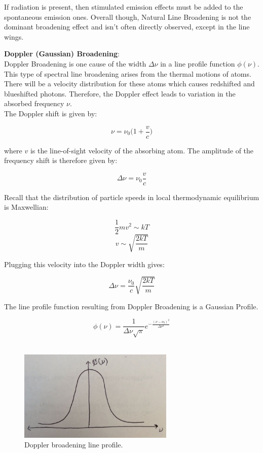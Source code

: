 \documentclass{article}
\begin{document}
If radiation is present, then stimulated emission effects must be added to the spontaneous emission ones. Overall though, Natural Line Broadening is not the dominant broadening effect and isn't often directly observed, except in the line wings.

\textbf{Doppler (Gaussian) Broadening}:\\

Doppler Broadening is one cause of the width $\Delta\nu$ in a line profile function $\phi(\nu)$. This type of spectral line broadening arises from the thermal motions of atoms. There will be a velocity distribution for these atoms which causes redshifted and blueshifted photons. Therefore, the Doppler effect leads to variation in the absorbed frequency $\nu$. \\

The Doppler shift is given by: 

$$\nu = \nu_{0}\bigg(1+{\frac{v}{c}}\bigg)$$

where $v$ is the line-of-sight velocity of the absorbing atom. The amplitude of the frequency shift is therefore given by: 

$$\Delta \nu = \nu_{0}{\frac{v}{c}}$$

Recall that the distribution of particle speeds in local thermodynamic equilibrium is Maxwellian:

$${\frac{1}{2}}mv^{2} \sim kT $$
$$v \sim \sqrt{{\frac{2kT}{m}}} $$

Plugging this velocity into the Doppler width gives:

$$\Delta \nu = {\frac{\nu_{0}}{c}}\sqrt{{\frac{2kT}{m}}} $$

The line profile function resulting from Doppler Broadening is a Gaussian Profile. 

$$\phi(\nu) = {\frac{1}{\Delta\nu\sqrt{\pi}}}e^{-{\frac{(\nu-\nu_{0})^{2}}{\Delta\nu^{2}}}} $$ \\

\begin{figure}[ht]
    \centering
    \includegraphics[width=0.66\textwidth]{figures/doppler.jpg}
    \caption{Doppler broadening line profile.}
    \label{fig:dopp}
\end{figure}
\end{document}
